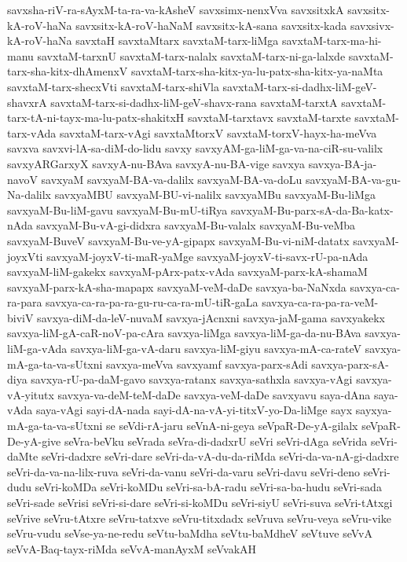 {savxsha-riV-ra-sAyxM-ta-ra-va-kAsheV
savxsimx-nenxVva
savxsitxkA
savxsitx-kA-roV-haNa
savxsitx-kA-roV-haNaM
savxsitx-kA-sana
savxsitx-kada
savxsivx-kA-roV-haNa
savxtaH
savxtaMtarx
savxtaM-tarx-liMga
savxtaM-tarx-ma-hi-manu
savxtaM-tarxnU
savxtaM-tarx-nalalx
savxtaM-tarx-ni-ga-lalxde
savxtaM-tarx-sha-kitx-dhAmenxV
savxtaM-tarx-sha-kitx-ya-lu-patx-sha-kitx-ya-naMta
savxtaM-tarx-shecxVti
savxtaM-tarx-shiVla
savxtaM-tarx-si-dadhx-liM-geV-shavxrA
savxtaM-tarx-si-dadhx-liM-geV-shavx-rana
savxtaM-tarxtA
savxtaM-tarx-tA-ni-tayx-ma-lu-patx-shakitxH
savxtaM-tarxtavx
savxtaM-tarxte
savxtaM-tarx-vAda
savxtaM-tarx-vAgi
savxtaMtorxV
savxtaM-torxV-hayx-ha-meVva
savxva
savxvi-lA-sa-diM-do-lidu
savxy
savxyAM-ga-liM-ga-va-na-ciR-su-valilx
savxyARGarxyX
savxyA-nu-BAva
savxyA-nu-BA-vige
savxya
savxya-BA-ja-navoV
savxyaM
savxyaM-BA-va-dalilx
savxyaM-BA-va-doLu
savxyaM-BA-va-gu-Na-dalilx
savxyaMBU
savxyaM-BU-vi-nalilx
savxyaMBu
savxyaM-Bu-liMga
savxyaM-Bu-liM-gavu
savxyaM-Bu-mU-tiRya
savxyaM-Bu-parx-sA-da-Ba-katx-nAda
savxyaM-Bu-vA-gi-didxra
savxyaM-Bu-valalx
savxyaM-Bu-veMba
savxyaM-BuveV
savxyaM-Bu-ve-yA-gipapx
savxyaM-Bu-vi-niM-datatx
savxyaM-joyxVti
savxyaM-joyxV-ti-maR-yaMge
savxyaM-joyxV-ti-savx-rU-pa-nAda
savxyaM-liM-gakekx
savxyaM-pArx-patx-vAda
savxyaM-parx-kA-shamaM
savxyaM-parx-kA-sha-mapapx
savxyaM-veM-daDe
savxya-ba-NaNxda
savxya-ca-ra-para
savxya-ca-ra-pa-ra-gu-ru-ca-ra-mU-tiR-gaLa
savxya-ca-ra-pa-ra-veM-biviV
savxya-diM-da-leV-nuvaM
savxya-jAcnxni
savxya-jaM-gama
savxyakekx
savxya-liM-gA-caR-noV-pa-cAra
savxya-liMga
savxya-liM-ga-da-nu-BAva
savxya-liM-ga-vAda
savxya-liM-ga-vA-daru
savxya-liM-giyu
savxya-mA-ca-rateV
savxya-mA-ga-ta-va-sUtxni
savxya-meVva
savxyamf
savxya-parx-sAdi
savxya-parx-sA-diya
savxya-rU-pa-daM-gavo
savxya-ratanx
savxya-sathxla
savxya-vAgi
savxya-vA-yitutx
savxya-va-deM-teM-daDe
savxya-veM-daDe
savxyavu
saya-dAna
saya-vAda
saya-vAgi
sayi-dA-nada
sayi-dA-na-vA-yi-titxV-yo-Da-liMge
sayx
sayxya-mA-ga-ta-va-sUtxni
se
seVdi-rA-jaru
seVnA-ni-geya
seVpaR-De-yA-gilalx
seVpaR-De-yA-give
seVra-beVku
seVrada
seVra-di-dadxrU
seVri
seVri-dAga
seVrida
seVri-daMte
seVri-dadxre
seVri-dare
seVri-da-vA-du-da-riMda
seVri-da-va-nA-gi-dadxre
seVri-da-va-na-lilx-ruva
seVri-da-vanu
seVri-da-varu
seVri-davu
seVri-deno
seVri-dudu
seVri-koMDa
seVri-koMDu
seVri-sa-bA-radu
seVri-sa-ba-hudu
seVri-sada
seVri-sade
seVrisi
seVri-si-dare
seVri-si-koMDu
seVri-siyU
seVri-suva
seVri-tAtxgi
seVrive
seVru-tAtxre
seVru-tatxve
seVru-titxdadx
seVruva
seVru-veya
seVru-vike
seVru-vudu
seVse-ya-ne-redu
seVtu-baMdha
seVtu-baMdheV
seVtuve
seVvA
seVvA-Baq-tayx-riMda
seVvA-manAyxM
seVvakAH
}

